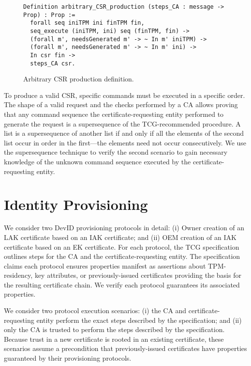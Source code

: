 \documentclass[runningheads]{llncs}
\begin{document}
\begin{figure}[hbtp]
  \vspace{-\medskipamount}
  \vspace{-\medskipamount}
  \begin{lstlisting}[language=Coq]
Definition arbitrary_CSR_production (steps_CA : message -> Prop) : Prop :=
  forall seq iniTPM ini finTPM fin,
  seq_execute (iniTPM, ini) seq (finTPM, fin) ->
  (forall m', needsGenerated m' -> ~ In m' iniTPM) ->
  (forall m', needsGenerated m' -> ~ In m' ini) ->
  In csr fin ->
  steps_CA csr.
  \end{lstlisting}
  \caption{Arbitrary CSR production definition.}
  \label{fig:csr-production}
\end{figure}


To produce a valid CSR, specific commands must be executed in a
specific order.  The shape of a valid request and the checks performed
by a CA allows proving that any command sequence the
certificate-requesting entity performed to generate the request is a
supersequence of the TCG-recommended procedure.  A list is a
supersequence of another list if and only if all the elements of the
second list occur in order in the first---the elements need not occur
consecutively. We use the supersequence technique to verify the second
scenario to gain necessary knowledge of the unknown command sequence
executed by the certificate-requesting entity.

\section{Identity Provisioning}

We consider two DevID provisioning protocols in detail: (i) Owner
creation of an LAK certificate based on an IAK certificate; and (ii)
OEM creation of an IAK certificate based on an EK certificate. For
each protocol, the TCG specification outlines steps for the CA and the
certificate-requesting entity. The specification claims each protocol
ensures properties manifest as assertions about TPM-residency, key
attributes, or previously-issued certificates providing the basis for
the resulting certificate chain. We verify each protocol guarantees
its associated properties.

We consider two protocol execution scenarios: (i) the CA and 
certificate-requesting entity perform the exact steps described 
by the specification; and (ii) only the 
CA is trusted to perform the steps described by the specification.  Because
trust in a new certificate is rooted in an existing certificate, these
scenarios assume a precondition that previously-issued certificates
have properties guaranteed by their provisioning protocols.
\end{document}
